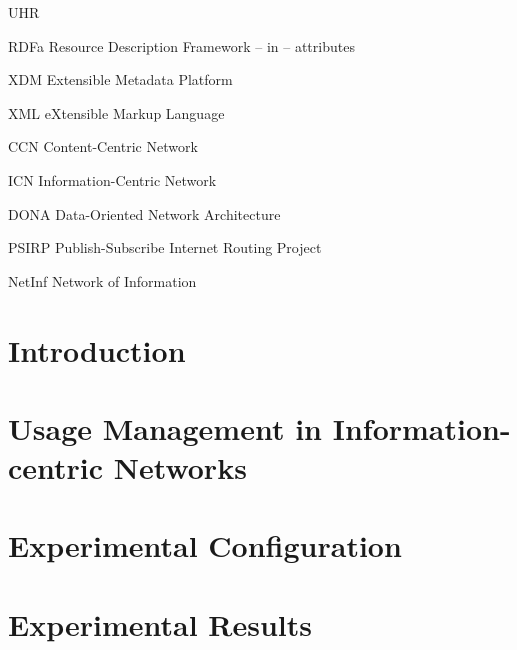 \documentclass[botnum,fleqn,final]{unmeethesis}
\begin{document}
\tableofcontents
\listoffigures
\listoftables

\begin{glossary}{UHR}
   \item[RDFa] Resource Description Framework -- in -- attributes
   \item[XDM] Extensible Metadata Platform
   \item[XML] eXtensible Markup Language
   \item[CCN] Content-Centric Network
   \item[ICN] Information-Centric Network
   \item[DONA] Data-Oriented Network Architecture
   \item[PSIRP] Publish-Subscribe Internet Routing Project
   \item[NetInf] Network of Information
\end{glossary}

\mainmatter

\chapter{Introduction}








\chapter{Usage Management in Information-centric Networks}





\chapter{Experimental Configuration}
% 


\chapter{Experimental Results}


\pagebreak



\end{document}
